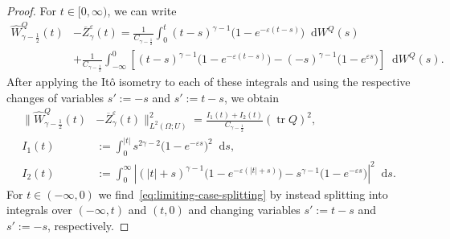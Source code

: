 \documentclass[reqno]{amsart}
\numberwithin{equation}{section}
\newcommand{\tr}{\operatorname{tr}}
\newcommand{\rd}{\mathop{}\!\mathrm{d}}
\theoremstyle{remark}
\theoremstyle{definition}
\begin{document}
\begin{proof}
	For $t \in [0,\infty)$, we can write
	\begin{align*}
		\widehat W^Q_{\gamma - \frac{1}{2}}(t) &- \overline Z_\gamma^\varepsilon(t)
		=
		\frac{1}{C_{\gamma - \frac{1}{2}}}
		\int_0^t (t-s)^{\gamma-1} \bigl(1 - e^{-\varepsilon(t-s)}\bigr) \rd W^Q(s)
		\\
		&+ 
		\frac{1}{C_{\gamma - \frac{1}{2}}}
		\int_{-\infty}^0 \left[(t-s)^{\gamma-1}\bigl(1 - e^{-\varepsilon(t-s)}\bigr)
		-
		(-s)^{\gamma-1}\bigl(1 - e^{\varepsilon s}\bigr)\right] \rd W^Q(s).
	\end{align*}
	After applying the It\^o isometry to each of these integrals
	and using the respective changes of variables $s' := - s$ and $s' := t -s$, we obtain
	\begin{align}\label{eq:limiting-case-splitting}
		\biggl\|\widehat W^Q_{\gamma - \frac{1}{2}}(t) &- \overline Z_\gamma^\varepsilon(t)\biggr\|_{L^2(\Omega; U)}^2
		=
		\frac{I_1(t) + I_2(t)}{C_{\gamma - \frac{1}{2}}}(\tr Q)^2, \\
		I_1(t) 
		&:= 
		\int_0^{|t|} s^{2\gamma-2} \bigl(1 - e^{-\varepsilon s}\bigr)^2 \rd s, 
		\\
		I_2(t) 
		&:= 
		\int_{0}^\infty \left\vert(|t|+s)^{\gamma-1}\bigl(1 - e^{-\varepsilon(|t|+s)}\bigr)
		-
		s^{\gamma-1}\bigl(1 - e^{-\varepsilon s}\bigr)\right\vert^2 \rd s.
	\end{align}
	For $t \in (-\infty, 0)$ we find~\eqref{eq:limiting-case-splitting}
	by instead splitting into integrals over
	$(-\infty, t)$ and $(t, 0)$ and changing variables
	$s' := t - s$ and $s' := -s$, respectively.
	

\end{proof}
\end{document}
